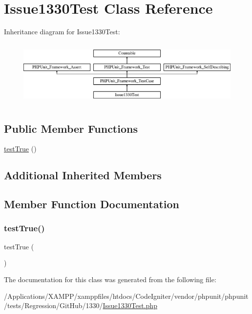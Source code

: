 \hypertarget{class_issue1330_test}{}\section{Issue1330\+Test Class Reference}
\label{class_issue1330_test}
Inheritance diagram for Issue1330\+Test\+:\begin{figure}[H]
\begin{center}
\leavevmode
\includegraphics[height=3.303835cm]{class_issue1330_test}
\end{center}
\end{figure}
\subsection*{Public Member Functions}
\begin{DoxyCompactItemize}
\item 
\mbox{\hyperlink{class_issue1330_test_a8cf315558f7f8c04df48a73b4f752f4b}{test\+True}} ()
\end{DoxyCompactItemize}
\subsection*{Additional Inherited Members}


\subsection{Member Function Documentation}
\mbox{\label{class_issue1330_test_a8cf315558f7f8c04df48a73b4f752f4b}} 
\subsubsection{\texorpdfstring{test\+True()}{testTrue()}}
{\footnotesize\ttfamily test\+True (\begin{DoxyParamCaption}{ }\end{DoxyParamCaption})}



The documentation for this class was generated from the following file\+:\begin{DoxyCompactItemize}
\item 
/\+Applications/\+X\+A\+M\+P\+P/xamppfiles/htdocs/\+Code\+Igniter/vendor/phpunit/phpunit/tests/\+Regression/\+Git\+Hub/1330/\mbox{\hyperlink{_issue1330_test_8php}{Issue1330\+Test.\+php}}\end{DoxyCompactItemize}
